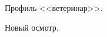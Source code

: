\documentclass[a4paper,14pt]{article}
\begin{document}
\begin{figure}[!h]
	\caption{Профиль <<ветеринар>>.}
	\label{fig:vet}
\end{figure}

\begin{figure}[!h]
	\caption{Новый осмотр.}
	\label{fig:visit}
\end{figure}
\end{document}
